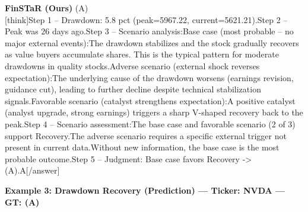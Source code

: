 \begin{minipage}[t]{0.41\textwidth}
\colorbox{green!10}{\parbox{\dimexpr\textwidth-2\fboxsep}{
\textbf{FinSTaR (Ours)} \textcolor{green!50!black}{(A)} \\[2pt]
\tiny
[think]\newline Step 1 -- Drawdown: 5.8 pct (peak=5967.22, current=5621.21).\newline Step 2 -- Peak was 26 days ago.\newline Step 3 -- Scenario analysis:\newline   Base case (most probable -- no major external events):\newline     The drawdown stabilizes and the stock gradually recovers as value buyers accumulate shares. This is the typical pattern for moderate drawdowns in quality stocks.\newline   Adverse scenario (external shock reverses expectation):\newline     The underlying cause of the drawdown worsens (earnings revision, guidance cut), leading to further decline despite technical stabilization signals.\newline   Favorable scenario (catalyst strengthens expectation):\newline     A positive catalyst (analyst upgrade, strong earnings) triggers a sharp V-shaped recovery back to the peak.\newline Step 4 -- Scenario assessment:\newline   The base case and favorable scenario (2 of 3) support Recovery.\newline   The adverse scenario requires a specific external trigger not present in current data.\newline   Without new information, the base case is the most probable outcome.\newline Step 5 -- Judgment: Base case favors Recovery -> (A).\newline [/think]\newline [answer]A[/answer]
}}
\end{minipage}
\vspace{8pt}


\noindent
\textbf{Example 3: Drawdown Recovery (Prediction) --- Ticker: NVDA --- GT: (A)}
\vspace{2pt}

